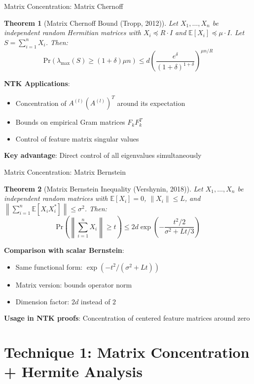 \documentclass{beamer}
\newtheorem{theorem}{Theorem}[section]
\newcommand{\E}{\mathbb{E}}
\newcommand{\Pr}{\text{Pr}}
\begin{document}
\begin{frame}{Matrix Concentration: Matrix Chernoff}
  \begin{theorem}[Matrix Chernoff Bound (Tropp, 2012)]
  Let $X_1, \ldots, X_n$ be independent random Hermitian matrices with $X_i \preceq R \cdot I$ and $\E[X_i] \preceq \mu \cdot I$. Let $S = \sum_{i=1}^n X_i$. Then:
  $$\Pr(\lambda_{\max}(S) \geq (1+\delta)\mu n) \leq d \left(\frac{e^\delta}{(1+\delta)^{1+\delta}}\right)^{\mu n / R}$$
  \end{theorem}
  
  \textbf{NTK Applications}:
  \begin{itemize}
    \item Concentration of $A^{(l)}(A^{(l)})^T$ around its expectation
    \item Bounds on empirical Gram matrices $F_k F_k^T$
    \item Control of feature matrix singular values
  \end{itemize}
  
  \textbf{Key advantage}: Direct control of all eigenvalues simultaneously
\end{frame}

\begin{frame}{Matrix Concentration: Matrix Bernstein}
  \begin{theorem}[Matrix Bernstein Inequality (Vershynin, 2018)]
  Let $X_1, \ldots, X_n$ be independent random matrices with $\E[X_i] = 0$, $\|X_i\| \leq L$, and $\left\|\sum_{i=1}^n \E[X_i X_i^*]\right\| \leq \sigma^2$. Then:
  $$\Pr\left(\left\|\sum_{i=1}^n X_i\right\| \geq t\right) \leq 2d \exp\left(-\frac{t^2/2}{\sigma^2 + Lt/3}\right)$$
  \end{theorem}
  
  \textbf{Comparison with scalar Bernstein}:
  \begin{itemize}
    \item Same functional form: $\exp(-t^2/(\sigma^2 + Lt))$
    \item Matrix version: bounds operator norm
    \item Dimension factor: $2d$ instead of $2$
  \end{itemize}
  
  \textbf{Usage in NTK proofs}: Concentration of centered feature matrices around zero
\end{frame}

\section{Technique 1: Matrix Concentration + Hermite Analysis}
\end{document}

